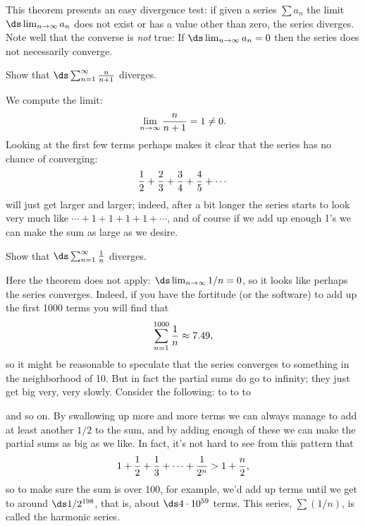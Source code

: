 \begin{theorem}
\begin{theorem}
This theorem presents an easy divergence 
test: if given a series $\sum
a_n$ the limit $\ds\lim_{n\to\infty}a_n$ does not exist or has a value
other than zero, the series diverges. Note well that the converse is
{\em not\/} true: If $\ds\lim_{n\to\infty}a_n=0$ then the series does
not necessarily converge.

\begin{example}
Show that $\ds\sum_{n=1}^\infty {n\over n+1}$ diverges.
\par\nobreak\ssk\noindent
We compute the limit:
$$\lim _{n\to\infty}{n\over n+1}=1\not=0.$$
Looking at the first few terms perhaps makes it clear that the series
has no chance of converging:
$${1\over2}+{2\over3}+{3\over4}+{4\over5}+\cdots$$
will just get larger and larger; indeed, after a bit longer the series
starts to look very much like $\cdots+1+1+1+1+\cdots$, and of course
if we add up enough 1's we can make the sum as large as we desire.
\end{example}

\begin{example}
Show that $\ds\sum_{n=1}^\infty {1\over n}$ diverges.
\par\nobreak\ssk\noindent
Here the theorem does not apply: $\ds\lim _{n\to\infty} 1/n=0$, so it
looks like perhaps the series converges. Indeed, if you have the
fortitude (or the software) to add up the first 1000 terms you will find that
$$\sum_{n=1}^{1000} {1\over n}\approx 7.49,$$
so it might be reasonable to speculate that the series converges to
something in the neighborhood of 10. But in fact the partial sums do go
to infinity; they just get big very, very slowly. Consider the
following:
\msk
\hbox to 
\msk
\hbox to 
\msk
\hbox to 

\msk\noindent
and so on. By swallowing up more and more terms we can always manage
to add at least another $1/2$ to the sum, and by adding enough of
these we can make the partial sums as big as we like. In fact, it's
not hard to see from this pattern that
$$1+{1\over 2}+{1\over 3}+\cdots+{1\over 2^n} > 1+{n\over 2},$$
so to make sure the sum is over 100, for example, we'd add
up terms until we get to around $\ds 1/2^{198}$, that is,
about $\ds 4\cdot 10^{59}$ terms. This series, $\sum (1/n)$, is called the
{\dfont harmonic series\/}.
\end{example}


\end{theorem}
\end{theorem}
